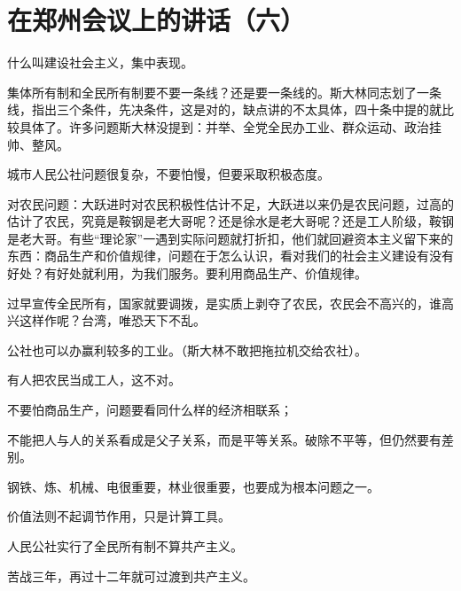 \section[在郑州会议上的讲话（六）（一九五九年三月）]{在郑州会议上的讲话（六）}


什么叫建设社会主义，集中表现。

集体所有制和全民所有制要不要一条线？还是要一条线的。斯大林同志划了一条线，指出三个条件，先决条件，这是对的，缺点讲的不太具体，四十条中提的就比较具体了。许多问题斯大林没提到：并举、全党全民办工业、群众运动、政治挂帅、整风。

城市人民公社问题很复杂，不要怕慢，但要采取积极态度。

对农民问题：大跃进时对农民积极性估计不足，大跃进以来仍是农民问题，过高的估计了农民，究竟是鞍钢是老大哥呢？还是徐水是老大哥呢？还是工人阶级，鞍钢是老大哥。有些“理论家”一遇到实际问题就打折扣，他们就回避资本主义留下来的东西：商品生产和价值规律，问题在于怎么认识，看对我们的社会主义建设有没有好处？有好处就利用，为我们服务。要利用商品生产、价值规律。


过早宣传全民所有，国家就要调拨，是实质上剥夺了农民，农民会不高兴的，谁高兴这样作呢？台湾，唯恐天下不乱。

公社也可以办赢利较多的工业。（斯大林不敢把拖拉机交给农社）。

有人把农民当成工人，这不对。

不要怕商品生产，问题要看同什么样的经济相联系；

不能把人与人的关系看成是父子关系，而是平等关系。破除不平等，但仍然要有差别。

钢铁、炼、机械、电很重要，林业很重要，也要成为根本问题之一。

价值法则不起调节作用，只是计算工具。

人民公社实行了全民所有制不算共产主义。

苦战三年，再过十二年就可过渡到共产主义。


